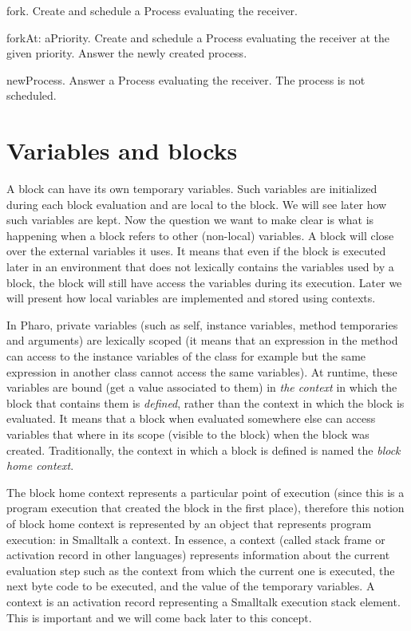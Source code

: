\documentclass[a4paper,10pt,twoside]{book}
\begin{document}
\begin{description}
\item{\textsf{fork}}. Create and schedule a Process evaluating the receiver.

\item{\textsf{forkAt: aPriority}}. Create and schedule a Process evaluating the receiver at the given priority. Answer the newly created process.

\item{\textsf{newProcess}}. Answer a Process evaluating the receiver. The process is not scheduled.
\end{description}


\section{Variables and blocks}
A block can have its own temporary variables. Such variables are initialized during each block evaluation and are local to the block. We will see later how such variables are kept. Now the question we want to make clear is what is happening when a block refers to other (non-local) variables. A block will close over the external variables it uses. It means that even if the block is executed later in an environment that does not lexically contains the variables used by a block, the block will still have access the variables during its execution. Later we will present how local variables are implemented and stored using contexts.

In Pharo, private variables (such as self, instance variables, method temporaries and arguments) are lexically scoped (it means that an expression in the method can access to the instance variables of the class for example but the same expression in another class cannot access the same variables). At runtime, these variables are bound (get a value associated to them) in \emph{the context} in which the block that contains them is \emph{defined}, rather than the context in which the block is evaluated. It means that a block when evaluated somewhere else can access variables that where in its scope (visible to the block) when the block was created. Traditionally, the context in which a block is defined is named the \emph{block home context}.

The block home context represents a particular point of execution (since this is a program execution that created the block in the first place), therefore this notion of block home context is represented by an object that represents program execution: in Smalltalk a context. In essence, a context (called stack frame or activation record in other languages) represents information about the current evaluation step such as the context from which the current one is executed, the next byte code to be executed, and the value of the temporary variables. A context is an activation record representing a Smalltalk execution stack element. This is important and we will come back later to this concept.
\end{document}

